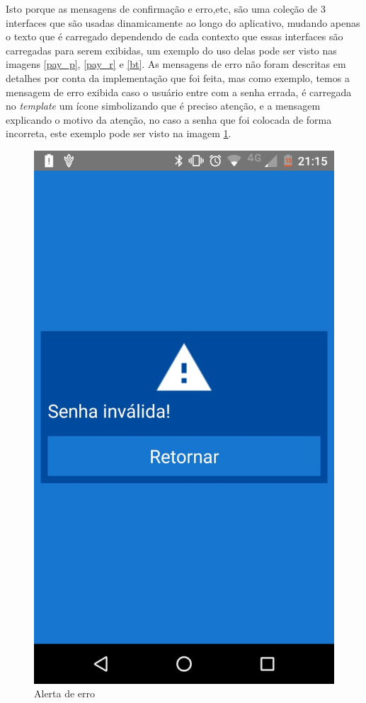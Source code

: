 \documentclass[hidelinks,12pt]{article}
\begin{document}
Isto porque as mensagens de confirma\c{c}\~ao e erro,etc, s\~ao uma cole\c{c}\~ao de 3 interfaces que s\~ao usadas dinamicamente ao longo do aplicativo, mudando apenas o texto que \'e carregado dependendo de cada contexto que essas interfaces s\~ao carregadas para serem exibidas, um exemplo do uso delas pode ser visto nas imagens \ref{pay_p}, \ref{pay_r} e \ref{bt}. As mensagens de erro n\~ao foram descritas em detalhes por conta da implementa\c{c}\~ao que foi feita, mas como exemplo, temos a mensagem de erro exibida caso o usu\'ario entre com a senha errada, \'e carregada no \textit{template} um \'icone simbolizando que \'e preciso aten\c{c}\~ao, e a mensagem explicando o motivo da aten\c{c}\~ao, no caso a senha que foi colocada de forma incorreta, este exemplo pode ser visto na imagem \ref{error}.
\begin{figure}[H]
	\centering
	\includegraphics[scale=0.3]{error} 
	\caption{Alerta de erro}
	\label{error}
\end{figure}
\end{document}
